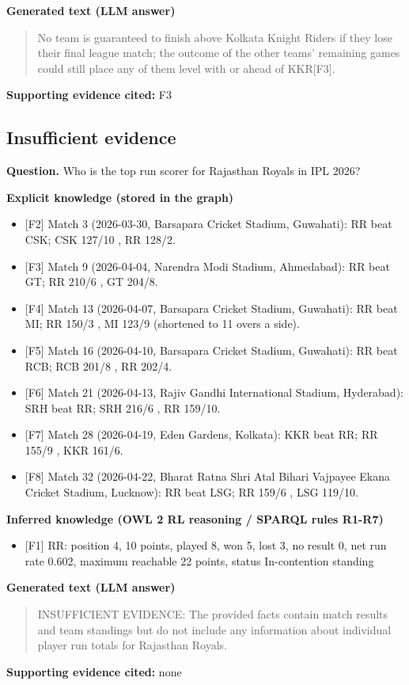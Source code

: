 \noindent\textcolor{kggenerated}{\textbf{Generated text (LLM answer)}}
\begin{quote}\small No team is guaranteed to finish above Kolkata Knight Riders if they lose their final league match; the outcome of the other teams' remaining games could still place any of them level with or ahead of KKR\textsf{[F3]}.\end{quote}
\noindent\textbf{Supporting evidence cited:} F3\par\medskip
\subsection{Insufficient evidence}
\noindent\textbf{Question.} Who is the top run scorer for Rajasthan Royals in IPL 2026?\par\smallskip
\noindent\textcolor{kgexplicit}{\textbf{Explicit knowledge (stored in the graph)}}
\begin{itemize}\setlength\itemsep{0pt}\footnotesize
\item{} [F2] Match 3 (2026-03-30, Barsapara Cricket Stadium, Guwahati): RR beat CSK; CSK 127/10 , RR 128/2.
\item{} [F3] Match 9 (2026-04-04, Narendra Modi Stadium, Ahmedabad): RR beat GT; RR 210/6 , GT 204/8.
\item{} [F4] Match 13 (2026-04-07, Barsapara Cricket Stadium, Guwahati): RR beat MI; RR 150/3 , MI 123/9 (shortened to 11 overs a side).
\item{} [F5] Match 16 (2026-04-10, Barsapara Cricket Stadium, Guwahati): RR beat RCB; RCB 201/8 , RR 202/4.
\item{} [F6] Match 21 (2026-04-13, Rajiv Gandhi International Stadium, Hyderabad): SRH beat RR; SRH 216/6 , RR 159/10.
\item{} [F7] Match 28 (2026-04-19, Eden Gardens, Kolkata): KKR beat RR; RR 155/9 , KKR 161/6.
\item{} [F8] Match 32 (2026-04-22, Bharat Ratna Shri Atal Bihari Vajpayee Ekana Cricket Stadium, Lucknow): RR beat LSG; RR 159/6 , LSG 119/10.
\end{itemize}
\noindent\textcolor{kginferred}{\textbf{Inferred knowledge (OWL 2 RL reasoning / SPARQL rules R1-R7)}}
\begin{itemize}\setlength\itemsep{0pt}\footnotesize
\item{} [F1] RR: position 4, 10 points, played 8, won 5, lost 3, no result 0, net run rate 0.602, maximum reachable 22 points, status In-contention standing
\end{itemize}
\noindent\textcolor{kggenerated}{\textbf{Generated text (LLM answer)}}
\begin{quote}\small INSUFFICIENT EVIDENCE: The provided facts contain match results and team standings but do not include any information about individual player run totals for Rajasthan Royals.\end{quote}
\noindent\textbf{Supporting evidence cited:} none\par\medskip
